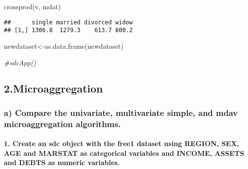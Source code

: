 \documentclass[
]{article}
\newenvironment{Shaded}{\begin{snugshade}}{\end{snugshade}}
\newcommand{\CommentTok}[1]{\textcolor[rgb]{0.56,0.35,0.01}{\textit{#1}}}
\newcommand{\FunctionTok}[1]{\textcolor[rgb]{0.00,0.00,0.00}{#1}}
\newcommand{\NormalTok}[1]{#1}
\newcommand{\OtherTok}[1]{\textcolor[rgb]{0.56,0.35,0.01}{#1}}
\begin{document}
\begin{Shaded}
\begin{Highlighting}[]
\FunctionTok{crossprod}\NormalTok{(v, mdat)}
\end{Highlighting}
\end{Shaded}

\begin{verbatim}
##      single married divorced widow
## [1,] 1306.8  1279.3    613.7 800.2
\end{verbatim}

\begin{Shaded}
\begin{Highlighting}[]
\NormalTok{newdataset}\OtherTok{\textless{}{-}}\FunctionTok{as.data.frame}\NormalTok{(newdataset)}
\end{Highlighting}
\end{Shaded}

\begin{Shaded}
\begin{Highlighting}[]
\CommentTok{\#sdcApp()}
\end{Highlighting}
\end{Shaded}

\hypertarget{microaggregation}{%
\subsection{2.Microaggregation}\label{microaggregation}}

\hypertarget{a-compare-the-univariate-multivariate-simple-and-mdav-microaggregation-algorithms.}{%
\subsubsection{a) Compare the univariate, multivariate simple, and mdav
microaggregation
algorithms.}\label{a-compare-the-univariate-multivariate-simple-and-mdav-microaggregation-algorithms.}}

\hypertarget{create-an-sdc-object-with-the-free1-dataset-using-region-sex-age-and-marstat-as-categorical-variables-and-income-assets-and-debts-as-numeric-variables.}{%
\paragraph{1. Create an sdc object with the free1 dataset using REGION,
SEX, AGE and MARSTAT as categorical variables and INCOME, ASSETS and
DEBTS as numeric
variables.}\label{create-an-sdc-object-with-the-free1-dataset-using-region-sex-age-and-marstat-as-categorical-variables-and-income-assets-and-debts-as-numeric-variables.}}
\end{document}
